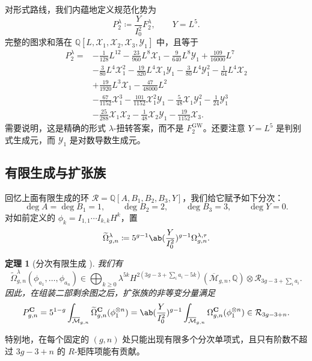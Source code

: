 \documentclass{amsart}
\newtheorem{thm}{定理}[section]
\theoremstyle{definition}
\theoremstyle{remark}
\theoremstyle{plain}
\theoremstyle{definition}
\theoremstyle{remark}
\newcommand{\Q}{\mathbb{Q}}
\newcommand{\Mbar}{\overline{\mathcal{M}}}
\newcommand{\mc}[1]{\mathcal{#1}}
\newcommand{\mbf}[1]{\mathbf{#1}}
\newcommand{\mr}[1]{\mathrm{#1}}
\newcommand{\wt}[1]{\widetilde{#1}}
\newcommand{\1}{\mathbf{1}}
\newcommand{\2}{\mathbf{2}}
\newcommand{\3}{\mathbf{3}}
\begin{document}
对形式路线，我们内蕴地定义规范化势为
\[ P_2^{\lambda} \coloneqq \frac{Y}{I_0^2}F_2^{\lambda}, \qquad Y = L^5. \]
完整的图求和落在 \(\Q[L,\mc{X}_1,\mc{X}_2,\mc{X}_3,\mc{Y}_1]\) 中，且等于
\begin{align*}
    P_2^{\lambda} ={}& -\frac{1}{128}L^{12} - \frac{23}{960}L^8\mc{X}_1 - \frac{9}{640}L^8\mc{Y}_1 + \frac{109}{16000}L^7 \\
    &- \frac{3}{80}L^4\mc{X}_1^2 - \frac{19}{320}L^4\mc{X}_1\mc{Y}_1 - \frac{3}{80}L^4\mc{Y}_1^2 - \frac{1}{64}L^4\mc{X}_2 \\
    &+ \frac{19}{1920}L^3\mc{X}_1 - \frac{47}{48000}L^2 \\
    &- \frac{67}{1152}\mc{X}_1^3 - \frac{101}{1152}\mc{X}_1^2\mc{Y}_1 - \frac{5}{48}\mc{X}_1\mc{Y}_1^2 - \frac{1}{24}\mc{Y}_1^3 \\
    &- \frac{25}{288}\mc{X}_1\mc{X}_2 - \frac{1}{48}\mc{X}_2\mc{Y}_1 - \frac{19}{1152}\mc{X}_3.
\end{align*}
需要说明，这是精确的形式 \(\lambda\)-扭转答案，而不是 \(F_2^{\mr{GW}}\)。还要注意 \(Y = L^5\) 是判别式生成元，而 \(\mc{Y}_1\) 是对数导数生成元。

\subsection{有限生成与扩张族}%
\label{sub:Finite generation and the extended family}

回忆上面有限生成的环 \(\mc{R} = \Q[A,B_1,B_2,B_3,Y]\)，我们给它赋予如下分次：
\[ \deg A = \deg B_1 = 1, \qquad \deg B_2 = 2, \qquad \deg B_3 = 3, \qquad \deg Y = 0. \]
对如前定义的 \(\phi_k = I_{1,1}\cdots I_{k,k}H^k\)，置
\[ \wt{\Omega}^{\lambda}_{g,n} \coloneqq 5^{g-1}\ab(\frac{Y}{I_0^2})^{g-1}\Omega^{\lambda,\tau}_{g,n}. \]

\begin{thm}[分次有限生成 {\cite{GJRstructure}}]%
\label{thm:graded finite generation}
    我们有
    \[ \wt{\Omega}^{\lambda}_{g,n}(\phi_{a_1}, \ldots, \phi_{a_n}) \in \bigoplus_{k \geq 0}\lambda^{5k}H^{2(3g-3+\sum_i a_i - 5k)}(\Mbar_{g,n},\Q)\otimes \mc{R}_{3g-3+\sum_i a_i}. \]
    因此，在组装二部剩余图之后，扩张族的非等变分量满足
    \[ P^{\mbf{C}}_{g,n} = 5^{1-g}\int_{\Mbar_{g,n}}\wt{\Omega}^{\mbf{C}}_{g,n}(\phi_1^{\otimes n}) = \ab( \frac{Y}{I_0^2})^{g-1}\int_{\Mbar_{g,n}}\Omega^{\mbf{C}}_{g,n}(\phi_1^{\otimes n}) \in \mc{R}_{3g-3+n}. \]
\end{thm}

特别地，在每个固定的 \((g,n)\) 处只能出现有限多个分次单项式，且只有阶数不超过 \(3g-3+n\) 的 \(R\)-矩阵项能有贡献。
\end{document}
